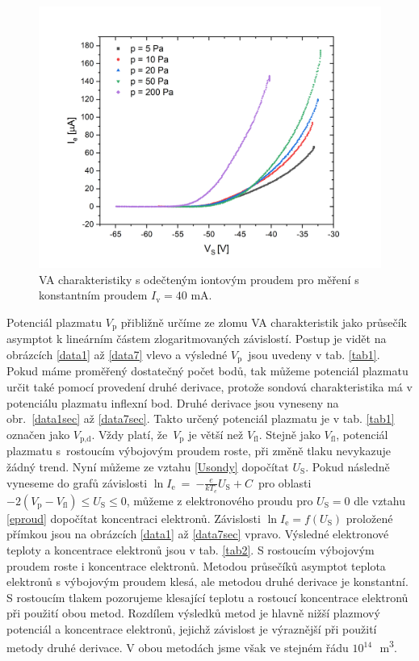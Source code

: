 \documentclass[a4paper,12pt]{article}
\begin{document}
\begin{figure}[h!]
	\centering
	\includegraphics[width=135mm]{odectene34567.png}
	\caption{VA charakteristiky s odečteným iontovým proudem pro měření s konstantním proudem $I_\text{v} = 40$ \si{\milli\ampere}.}
	\label{odectene34567}
\end{figure}

\newpage
Potenciál plazmatu $V_\text{p}$ přibližně určíme ze zlomu VA charakteristik 
jako průsečík asymptot k lineárním částem zlogaritmovaných závislostí. Postup 
je vidět na obrázcích \ref{data1} až \ref{data7} vlevo a výsledné 
$V_\text{p}$~jsou uvedeny v tab. \ref{tab1}. Pokud máme proměřený dostatečný 
počet bodů, tak můžeme potenciál plazmatu určit také pomocí provedení druhé 
derivace, protože sondová charakteristika má v potenciálu plazmatu inflexní 
bod. Druhé derivace jsou vyneseny na obr.~\ref{data1sec} až \ref{data7sec}. 
Takto určený potenciál plazmatu je v tab. \ref{tab1} označen jako 
$V_\text{p,d}$. Vždy platí, že~$V_\text{p}$ je větší než $V_\text{fl}$. Stejně 
jako 
$V_\text{fl}$, potenciál plazmatu s~rostoucím výbojovým proudem roste, při změně
tlaku nevykazuje žádný trend. Nyní můžeme ze vztahu \eqref{Usondy} dopočítat $U_\text{S}$. Pokud následně vyneseme do grafů závislosti $\ln
I_{\text{e}}$~=~$-\frac{e}{kT_e}U_\text{S}+C$~pro oblasti $-2(V_\text{p} - 
V_\text{{fl}}) \leq U_\text{S} \leq 0$, můžeme z
elektronového proudu pro $U_\text{S} = 0$ dle vztahu \eqref{eproud} dopočítat koncentraci elektronů. Závislosti $\ln I_{\text{e}} =
f(U_\text{S})$ proložené přímkou jsou na obrázcích \ref{data1} až 
\ref{data7sec} vpravo. Výsledné elektronové teploty a koncentrace
elektronů jsou v tab. \ref{tab2}. S rostoucím výbojovým proudem roste i 
koncentrace elektronů. Metodou průsečíků asymptot teplota elektronů s výbojovým 
proudem klesá, ale metodou druhé derivace je konstantní. S rostoucím
tlakem pozorujeme klesající teplotu a rostoucí koncentrace elektronů při 
použití obou metod. Rozdílem výsledků metod je hlavně nižší plazmový potenciál 
a koncentrace elektronů, jejichž závislost je výraznější při použití metody 
druhé derivace. V obou metodách jsme však ve stejném řádu 
$10^{14}$\,\si{\per\cubic\meter}.
\end{document}
